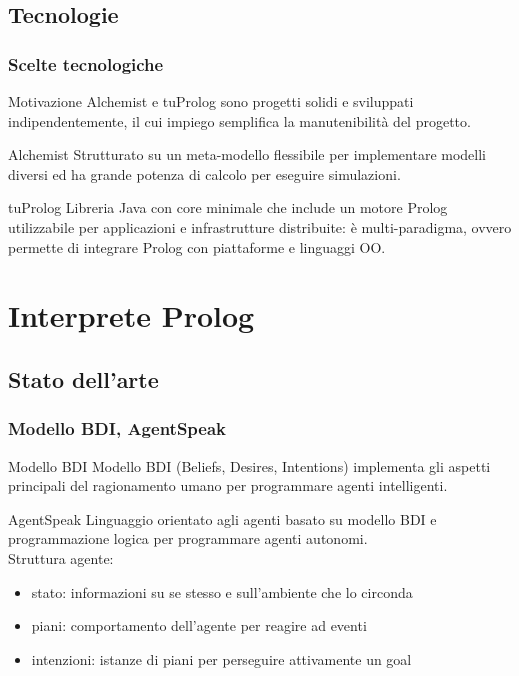 \documentclass[handout]{beamer}\mode<presentation>{\usetheme{AMSCesenaBleu}}
\begin{document}
\subsection{Tecnologie}
\begin{frame}
\frametitle{Scelte tecnologiche}
\begin{block}{Motivazione}
Alchemist e tuProlog sono progetti solidi e sviluppati indipendentemente, il cui impiego semplifica la manutenibilità del progetto. 
\end{block}

\begin{block}{Alchemist}
Strutturato su un meta-modello flessibile per implementare modelli diversi ed ha grande potenza di calcolo per eseguire simulazioni.
\end{block}

\begin{block}{tuProlog}
Libreria Java con core minimale che include un motore Prolog utilizzabile per applicazioni e infrastrutture distribuite: è multi-paradigma, ovvero permette di integrare Prolog con piattaforme e linguaggi OO.
\end{block}
\end{frame}



\section{Interprete Prolog}

\subsection{Stato dell'arte}
\begin{frame}
\frametitle{Modello BDI, AgentSpeak}
\begin{block}{Modello BDI}
Modello BDI (Beliefs, Desires, Intentions) implementa gli aspetti principali del ragionamento umano per programmare agenti intelligenti.
\end{block}
\begin{block}{AgentSpeak}
Linguaggio orientato agli agenti basato su modello BDI e programmazione logica per programmare agenti autonomi.
\\\vspace{0.2cm}
Struttura agente:
\begin{itemize}
\item \alert{stato}: informazioni su se stesso e sull'ambiente che lo circonda
\item \alert{piani}: comportamento dell'agente per reagire ad eventi
\item \alert{intenzioni}: istanze di piani per perseguire attivamente un goal
\end{itemize}
\end{block}
\end{frame}
\end{document}

